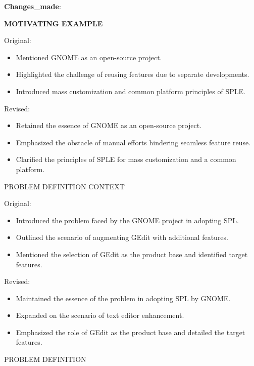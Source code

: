 \documentclass[11pt]{article}
\newenvironment{changes}
   {\medskip \noindent \begin{sf}\textbf{Changes\_made}:\  }
   {\medskip \end{sf}}
\begin{document}
\begin{changes}
    
    \textbf{MOTIVATING EXAMPLE}
    
    Original:
    \begin{itemize}
        \item Mentioned GNOME as an open-source project.
        \item Highlighted the challenge of reusing features due to separate developments.
        \item Introduced mass customization and common platform principles of SPLE.
    \end{itemize} 
    Revised:
    \begin{itemize}
        \item Retained the essence of GNOME as an open-source project.
        \item Emphasized the obstacle of manual efforts hindering seamless feature reuse.
        \item Clarified the principles of SPLE for mass customization and a common platform.
    \end{itemize} 
    
    PROBLEM DEFINITION CONTEXT
    
    Original:
    \begin{itemize}
        \item Introduced the problem faced by the GNOME project in adopting SPL.
        \item Outlined the scenario of augmenting GEdit with additional features.
        \item Mentioned the selection of GEdit as the product base and identified target features.
        \end{itemize} 
    Revised:
    \begin{itemize}
        \item Maintained the essence of the problem in adopting SPL by GNOME.
        \item Expanded on the scenario of text editor enhancement.
        \item Emphasized the role of GEdit as the product base and detailed the target features.
        \end{itemize} 
        
    PROBLEM DEFINITION
    

\end{changes}
\end{document}
